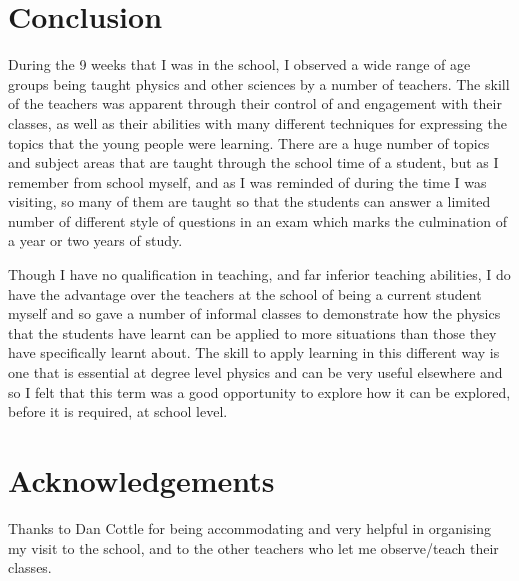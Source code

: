 \section{Conclusion} %
\label{sec:Conclusion}
    During the 9 weeks that I was in the school, I observed a wide range of age groups being taught physics and other sciences by a number of teachers. The skill of the teachers was apparent through their control of and engagement with their classes, as well as their abilities with many different techniques for expressing the topics that the young people were learning. There are a huge number of topics and subject areas that are taught through the school time of a student, but as I remember from school myself, and as I was reminded of during the time I was visiting, so many of them are taught so that the students can answer a limited number of different style of questions in an exam which marks the culmination of a year or two years of study.

    Though I have no qualification in teaching, and far inferior teaching abilities, I do have the advantage over the teachers at the school of being a current student myself and so gave a number of informal classes to demonstrate how the physics that the students have learnt can be applied to more situations than those they have specifically learnt about. The skill to apply learning in this different way is one that is essential at degree level physics and can be very useful elsewhere and so I felt that this term was a good opportunity to explore how it can be explored, before it is required, at school level. 

\section{Acknowledgements} %
\label{sec:Acknowlegements}
    Thanks to Dan Cottle for being accommodating and very helpful in organising my visit to the school, and to the other teachers who let me observe/teach their classes.
